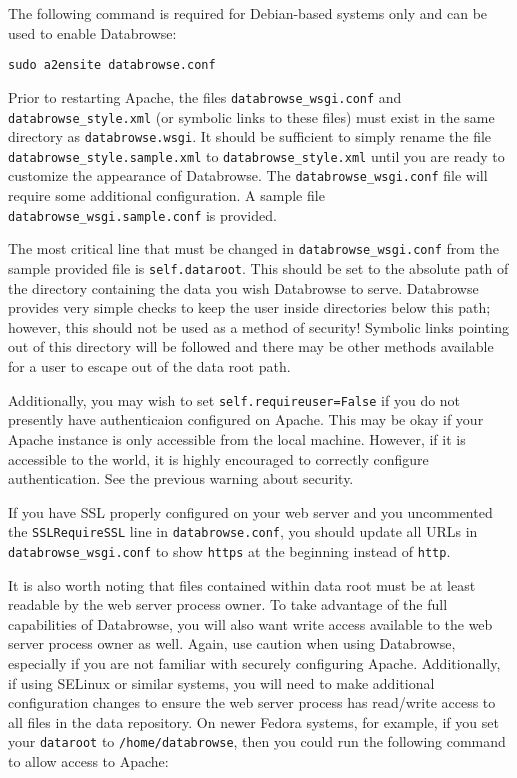 \documentclass[10pt]{article}
\begin{document}
The following command is required for Debian-based systems only and can be used to enable Databrowse:

\begin{verbatim}
sudo a2ensite databrowse.conf
\end{verbatim}

Prior to restarting Apache, the files \texttt{databrowse\_wsgi.conf} and \texttt{databrowse\_style.xml} (or symbolic links to these files) must exist in the same directory as \texttt{databrowse.wsgi}.  It should be sufficient to simply rename the file \texttt{databrowse\_style.sample.xml} to \texttt{databrowse\_style.xml} until you are ready to customize the appearance of Databrowse.  The \texttt{databrowse\_wsgi.conf} file will require some additional configuration.  A sample file \texttt{databrowse\_wsgi.sample.conf} is provided.

The most critical line that must be changed in \texttt{databrowse\_wsgi.conf} from the sample provided file is \texttt{self.dataroot}.  This should be set to the absolute path of the directory containing the data you wish Databrowse to serve.  Databrowse provides very simple checks to keep the user inside directories below this path; however, this should not be used as a method of security!  Symbolic links pointing out of this directory will be followed and there may be other methods available for a user to escape out of the data root path.

Additionally, you may wish to set \texttt{self.requireuser=False} if you do not presently have authenticaion configured on Apache.  This may be okay if your Apache instance is only accessible from the local machine.  However, if it is accessible to the world, it is highly encouraged to correctly configure authentication.  See the previous warning about security.

If you have SSL properly configured on your web server and you uncommented the \texttt{SSLRequireSSL} line in \texttt{databrowse.conf}, you should update all URLs in \texttt{databrowse\_wsgi.conf} to show \texttt{https} at the beginning instead of \texttt{http}.

It is also worth noting that files contained within data root must be at least readable by the web server process owner.  To take advantage of the full capabilities of Databrowse, you will also want write access available to the web server process owner as well.  Again, use caution when using Databrowse, especially if you are not familiar with securely configuring Apache.  Additionally, if using SELinux or similar systems, you will need to make additional configuration changes to ensure the web server process has read/write access to all files in the data repository.  On newer Fedora systems, for example, if you set your \texttt{dataroot} to \texttt{/home/databrowse}, then you could run the following command to allow access to Apache:
\end{document}
